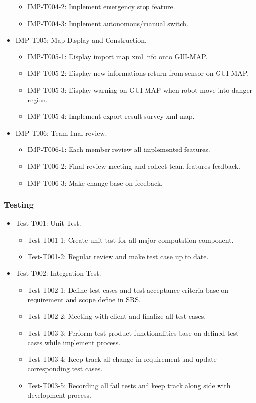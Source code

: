 \documentclass[11pt, a4paper]{article}
\begin{document}
\begin{itemize}
\begin{itemize}
					\item IMP-T004-2: Implement emergency stop feature.
					\item IMP-T004-3: Implement autonomous/manual switch.
			\end{itemize}
			\item IMP-T005: Map Display and Construction.
			\begin{itemize}
				\item IMP-T005-1: Display import map xml info onto GUI-MAP.
				\item IMP-T005-2: Display new informations return from sensor on GUI-MAP.
				\item IMP-T005-3: Display warning on GUI-MAP when robot move into danger region.
				\item IMP-T005-4: Implement export result survey xml map.
			\end{itemize}
			\item IMP-T006: Team final review.
			\begin{itemize}
				\item IMP-T006-1: Each member review all implemented features.
				\item IMP-T006-2: Final review meeting and collect team features feedback.
				\item IMP-T006-3: Make change base on feedback.
			\end{itemize}
		\end{itemize}
	
		\subsubsection{Testing}
		\begin{itemize}
			\item Test-T001: Unit Test.
			\begin{itemize}
					\item Test-T001-1: Create unit test for all major computation component.
					\item Test-T001-2: Regular review and make test case up to date.
			\end{itemize}
			\item Test-T002: Integration Test.
			\begin{itemize}
					\item Test-T002-1: Define test cases and test-acceptance criteria base on requirement and scope define in SRS.
					\item Test-T002-2: Meeting with client and finalize all test cases.
					\item Test-T003-3: Perform test product functionalities base on defined test cases while implement process.
					\item Test-T003-4: Keep track all change in requirement and update corresponding test cases.
					\item Test-T003-5: Recording all fail tests and keep track along side with development process.
			\end{itemize}
		\end{itemize}
	
\end{document}
